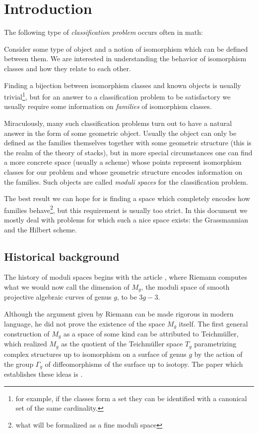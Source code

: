 \chapter{Introduction}
The following type of \textit{classification problem} occurs often in math:
\begin{center}
Consider some type of object and a notion of isomorphism which can be defined between them. We are interested in understanding the behavior of isomorphism classes and how they relate to each other.
\end{center}
Finding a bijection between isomorphism classes and known objects is usually trivial\footnote{for example, if the classes form a set they can be identified with a canonical set of the same cardinality.}, but for an answer to a classification problem to be satisfactory we usually require some information on \textit{families} of isomorphism classes.\medskip

Miraculously, many such classification problems turn out to have a natural answer in the form of some geometric object. Usually the object can only be defined as the families themselves together with some geometric structure (this is the realm of the theory of stacks), but in more special circumstances one can find a more concrete space (usually a scheme) whose points represent isomorphism classes for our problem and whose geometric structure encodes information on the families. Such objects are called \textit{moduli spaces} for the classification problem.\medskip

The best result we can hope for is finding a space which completely encodes how families behave\footnote{what will be formalized as a fine moduli space}, but this requirement is usually too strict.
In this document we mostly deal with problems for which such a nice space exists: the Grassmannian and the Hilbert scheme.\medskip



\section*{Historical background}
The history of moduli spaces begins with the article \cite{riemann54theorie}, where Riemann computes what we would now call the dimension of $M_g$, the moduli space of smooth projective algebraic curves of genus $g$, to be $3g-3$.\medskip

Although the argument given by Riemann can be made rigorous in modern language, he did not prove the existence of the space $M_g$ itself. The first general construction of $M_g$ as a space of some kind can be attributed to Teichm\"uller, which realized $M_g$ as the quotient of the Teichm\"uller space $T_g$ parametrizing complex structures up to isomorphism on a surface of genus $g$ by the action of the group $\Gamma_g$ of diffeomorphisms of the surface up to isotopy. The paper which establishes these ideas is \cite{teichmuller1939extremale}.\medskip

